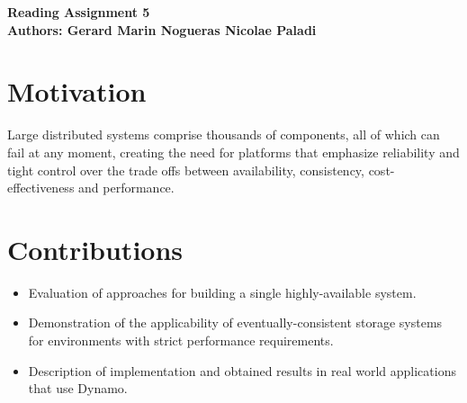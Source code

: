 \documentclass[10pt]{proc}
\begin{document}
\large{\textbf{Reading Assignment 5}}\\
\large{\textbf{Authors: Gerard Marin Nogueras \newline Nicolae Paladi}}\\
\section{Motivation}
Large distributed systems comprise thousands of components, all of which can fail at any moment, creating the need for platforms that emphasize reliability and tight control over the trade offs between availability, consistency, cost-effectiveness and performance. 


\section{Contributions}
\begin{itemize}
\item Evaluation of approaches for building a single highly-available system. 
\item Demonstration of the applicability of eventually-consistent storage systems for environments with strict performance requirements. 
\item Description of implementation and obtained results in real world applications that use Dynamo. 
\end{itemize}
\end{document}
